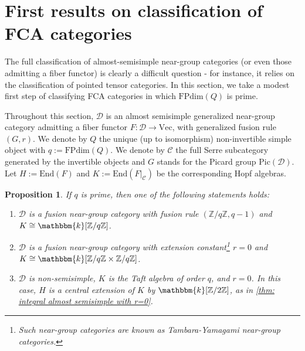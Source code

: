 \documentclass{amsart}
\theoremstyle{plain}%
\newtheorem{prop}[lemma]{Proposition}
\theoremstyle{remark}
\newcommand{\C}{\mathcal{C}}
\newcommand{\1}{\mathbbm{1}}
\newcommand{\D}{\mathcal{D}}
\newcommand{\Z}{\mathbb{Z}}
\newcommand{\End}{\mathrm{End}}
\newcommand{\FPdim}{\mathrm{FPdim}}
\newcommand{\Vect}{\mathrm{Vec}}
\newcommand{\kk}{\mathbbm{k}}
\newcommand{\pic}{\mathrm{Pic}}
\begin{document}
\section{First results on classification of FCA categories}\label{sec: classification first results}
    The full classification of almost-semisimple near-group categories (or even those admitting a fiber functor) is clearly a difficult question - for instance, it relies on the classification of pointed tensor categories. In this section, we take a modest first step of classifying FCA categories in which $\FPdim(Q)$ is prime.

    Throughout this section, $\D$ is an almost semisimple generalized near-group category admitting a fiber functor $F:\D\to \Vect$, with generalized fusion rule $(G,r)$. We denote by $Q$ the unique (up to isomorphism) non-invertible simple object with $q:=\FPdim(Q)$. We denote by $\C$ the full Serre subcategory generated by the invertible objects and $G$ stands for the Picard group $\pic(\D)$. Let $H:=\End(F)$ and $K:=\End(F\rvert_\C)$ be the corresponding Hopf algebras.
    \begin{prop}\label{prop: almost-semisimple near-group categories with prime dimension}
        If $q$ is prime, then one of the following statements holds:
    \begin{enumerate}
        \item $\D$ is a fusion near-group category with fusion rule $(\Z/q\Z,q-1)$ and  $K\cong \kk[\Z/q\Z]$.  
        \item $\D$ is a fusion near-group category with extension constant\footnote{Such near-group categories are known as Tambara-Yamagami near-group categories.} $r=0$ and $K \cong \kk[\Z/q\Z\times \Z/q\Z]$. 
      
        \item $\D$ is non-semisimple, $K$ is the Taft algebra of order $q$, and $r=0$. In this case, $H$ is a central extension of $K$ by $\kk[\Z/2\Z]$, as in \cref{thm: integral almost semisimple with r=0}.
        \end{enumerate}
    \end{prop}
\end{document}
